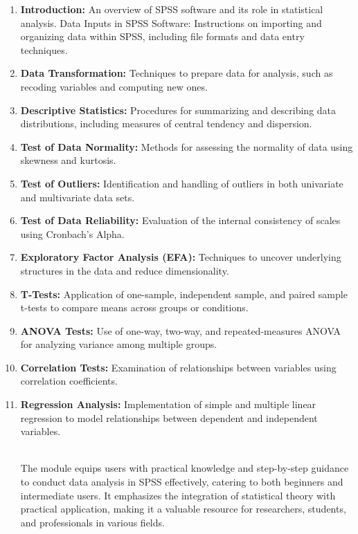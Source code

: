 \documentclass[
  letterpaper,
  DIV=11,
  numbers=noendperiod]{scrreprt}
\providecommand{\tightlist}{%
  \setlength{\itemsep}{0pt}\setlength{\parskip}{0pt}}\usepackage{longtable,booktabs,array}
\begin{document}
\begin{enumerate}
\def\labelenumi{\arabic{enumi}.}
\tightlist
\item
  \textbf{Introduction:} An overview of SPSS software and its role in
  statistical analysis. Data Inputs in SPSS Software: Instructions on
  importing and organizing data within SPSS, including file formats and
  data entry techniques.\\
\item
  \textbf{Data Transformation:} Techniques to prepare data for analysis,
  such as recoding variables and computing new ones.\\
\item
  \textbf{Descriptive Statistics:} Procedures for summarizing and
  describing data distributions, including measures of central tendency
  and dispersion.\\
\item
  \textbf{Test of Data Normality:} Methods for assessing the normality
  of data using skewness and kurtosis.\\
\item
  \textbf{Test of Outliers:} Identification and handling of outliers in
  both univariate and multivariate data sets.\\
\item
  \textbf{Test of Data Reliability:} Evaluation of the internal
  consistency of scales using Cronbach's Alpha.\\
\item
  \textbf{Exploratory Factor Analysis (EFA):} Techniques to uncover
  underlying structures in the data and reduce dimensionality.\\
\item
  \textbf{T-Tests:} Application of one-sample, independent sample, and
  paired sample t-tests to compare means across groups or conditions.\\
\item
  \textbf{ANOVA Tests:} Use of one-way, two-way, and repeated-measures
  ANOVA for analyzing variance among multiple groups.\\
\item
  \textbf{Correlation Tests:} Examination of relationships between
  variables using correlation coefficients.\\
\item
  \textbf{Regression Analysis:} Implementation of simple and multiple
  linear regression to model relationships between dependent and
  independent variables.\\
  \strut \\
  The module equips users with practical knowledge and step-by-step
  guidance to conduct data analysis in SPSS effectively, catering to
  both beginners and intermediate users. It emphasizes the integration
  of statistical theory with practical application, making it a valuable
  resource for researchers, students, and professionals in various
  fields.\\
\end{enumerate}
\end{document}
